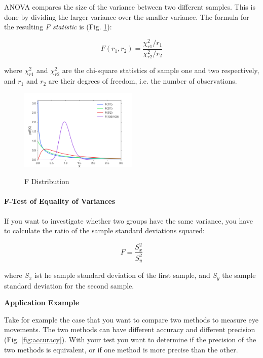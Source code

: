 ANOVA compares the size of the variance between two different samples. This is done by dividing the larger variance over the smaller variance. The formula for the resulting \emph{F statistic} is (Fig. \ref{fig:Fdistribution}):

\begin{equation}
    F(r_1, r_2) = \frac{\chi_{r1} ^2 /r_1}{\chi_{r2} ^2 /r_2}
\end{equation}

where $\chi_{r1}^2$ and $\chi_{r2}^2$ are the chi-square statistics of sample one and two respectively, and $r_1$ and $r_2$ are their degrees of freedom, i.e. the number of observations.

\begin{figure}
  \centering
  \includegraphics[width=0.5\textwidth]{../Images/dist_f.png}\\
  \caption{F Distribution}
  \label{fig:Fdistribution}
\end{figure}


\paragraph{F-Test of Equality of Variances}
If you want to investigate whether two groups have the same variance, you have to calculate the ratio of the sample standard deviations squared:

\begin{equation}
  F = \frac{S_x^2}{S_y^2}
\end{equation}

where $S_x$ ist he sample standard deviation of the first sample, and $S_y$ the sample standard deviation for the second sample.

\textbf{Application Example}

Take for example the case that you want to compare two methods to measure eye movements. The two methods
can have different accuracy and different precision (Fig. \ref{fig:accuracy}). With your test you want to
determine if the precision of the two methods is equivalent, or if one
method is more precise than the other.

